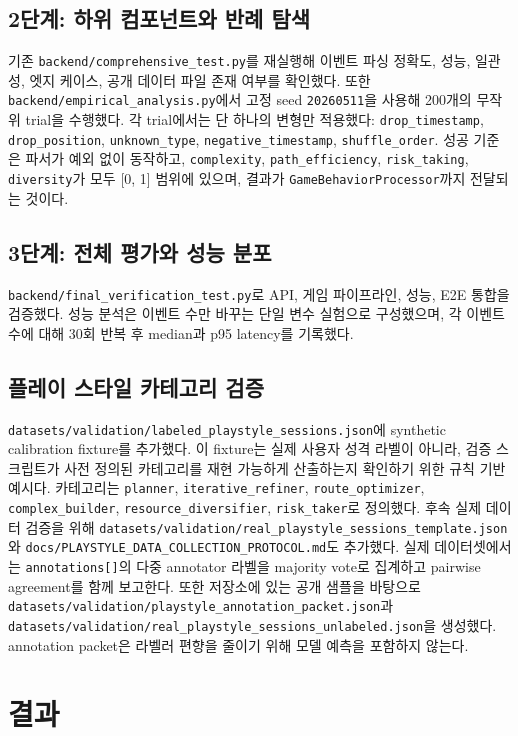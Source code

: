 \documentclass[11pt,a4paper]{article}
\begin{document}
\subsection{2단계: 하위 컴포넌트와 반례 탐색}
기존 \texttt{backend/comprehensive\_test.py}를 재실행해 이벤트 파싱 정확도, 성능,
일관성, 엣지 케이스, 공개 데이터 파일 존재 여부를 확인했다. 또한
\texttt{backend/empirical\_analysis.py}에서 고정 seed \texttt{20260511}을 사용해
200개의 무작위 trial을 수행했다. 각 trial에서는 단 하나의 변형만 적용했다:
\texttt{drop\_timestamp}, \texttt{drop\_position}, \texttt{unknown\_type},
\texttt{negative\_timestamp}, \texttt{shuffle\_order}. 성공 기준은 파서가 예외 없이
동작하고, \texttt{complexity}, \texttt{path\_efficiency}, \texttt{risk\_taking},
\texttt{diversity}가 모두 [0, 1] 범위에 있으며, 결과가 \texttt{GameBehaviorProcessor}까지
전달되는 것이다.

\subsection{3단계: 전체 평가와 성능 분포}
\texttt{backend/final\_verification\_test.py}로 API, 게임 파이프라인, 성능, E2E 통합을
검증했다. 성능 분석은 이벤트 수만 바꾸는 단일 변수 실험으로 구성했으며, 각 이벤트 수에 대해
30회 반복 후 median과 p95 latency를 기록했다.

\subsection{플레이 스타일 카테고리 검증}
\texttt{datasets/validation/labeled\_playstyle\_sessions.json}에 synthetic calibration fixture를
추가했다. 이 fixture는 실제 사용자 성격 라벨이 아니라, 검증 스크립트가 사전 정의된 카테고리를
재현 가능하게 산출하는지 확인하기 위한 규칙 기반 예시다. 카테고리는 \texttt{planner},
\texttt{iterative\_refiner}, \texttt{route\_optimizer}, \texttt{complex\_builder},
\texttt{resource\_diversifier}, \texttt{risk\_taker}로 정의했다. 후속 실제 데이터 검증을 위해
\texttt{datasets/validation/real\_playstyle\_sessions\_template.json}와
\texttt{docs/PLAYSTYLE\_DATA\_COLLECTION\_PROTOCOL.md}도 추가했다. 실제 데이터셋에서는
\texttt{annotations[]}의 다중 annotator 라벨을 majority vote로 집계하고 pairwise agreement를
함께 보고한다. 또한 저장소에 있는 공개 샘플을 바탕으로
\texttt{datasets/validation/playstyle\_annotation\_packet.json}과
\texttt{datasets/validation/real\_playstyle\_sessions\_unlabeled.json}을 생성했다.
annotation packet은 라벨러 편향을 줄이기 위해 모델 예측을 포함하지 않는다.

\section{결과}
\end{document}
